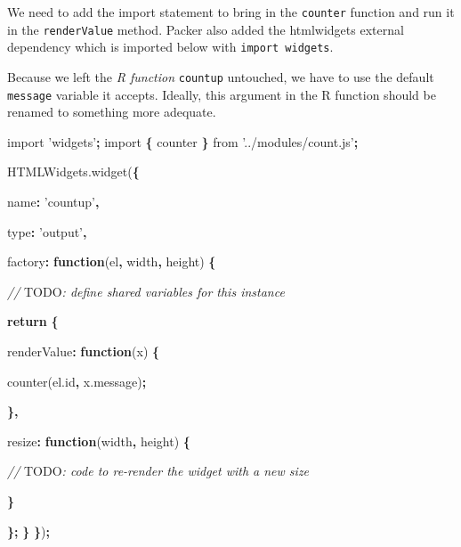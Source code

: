 \documentclass[10pt,]{krantz}
\makeatletter
\newenvironment{Shaded}{\begin{snugshade}}{\end{snugshade}}
\newcommand{\AlertTok}[1]{\textcolor[rgb]{0.33,0.33,0.33}{#1}}
\newcommand{\AttributeTok}[1]{\textcolor[rgb]{0.61,0.61,0.61}{#1}}
\newcommand{\CommentTok}[1]{\textcolor[rgb]{0.37,0.37,0.37}{\textit{#1}}}
\newcommand{\ControlFlowTok}[1]{\textcolor[rgb]{0.27,0.27,0.27}{\textbf{#1}}}
\newcommand{\DataTypeTok}[1]{\textcolor[rgb]{0.27,0.27,0.27}{#1}}
\newcommand{\ImportTok}[1]{#1}
\newcommand{\KeywordTok}[1]{\textcolor[rgb]{0.27,0.27,0.27}{\textbf{#1}}}
\newcommand{\NormalTok}[1]{#1}
\newcommand{\OperatorTok}[1]{\textcolor[rgb]{0.43,0.43,0.43}{\textbf{#1}}}
\newcommand{\StringTok}[1]{\textcolor[rgb]{0.5,0.5,0.5}{#1}}
\newcommand{\VariableTok}[1]{\textcolor[rgb]{0,0,0}{#1}}
\newenvironment{kframe}{%
\medskip{}
\setlength{\fboxsep}{.8em}
 \def\at@end@of@kframe{}%
 \ifinner\ifhmode%
  \def\at@end@of@kframe{\end{minipage}}%
  \begin{minipage}{\columnwidth}%
 \fi\fi%
 \def\FrameCommand##1{\hskip\@totalleftmargin \hskip-\fboxsep
 \colorbox{shadecolor}{##1}\hskip-\fboxsep
     \hskip-\linewidth \hskip-\@totalleftmargin \hskip\columnwidth}%
 \MakeFramed {\advance\hsize-\width
   \@totalleftmargin\z@ \linewidth\hsize
   \@setminipage}}%
 {\par\unskip\endMakeFramed%
 \at@end@of@kframe}
\renewenvironment{Shaded}{\begin{kframe}}{\end{kframe}}
\makeatother
\begin{document}
We need to add the import statement to bring in the \texttt{counter} function and run it in the \texttt{renderValue} method. Packer also added the htmlwidgets external dependency which is imported below with \texttt{import\ \textquotesingle{}widgets\textquotesingle{}}.

Because we left the \emph{R function} \texttt{countup} untouched, we have to use the default \texttt{message} variable it accepts. Ideally, this argument in the R function should be renamed to something more adequate.

\begin{Shaded}
\begin{Highlighting}[]
\ImportTok{import} \StringTok{'widgets'}\OperatorTok{;}
\ImportTok{import} \OperatorTok{\{}\NormalTok{ counter }\OperatorTok{\}} \ImportTok{from} \StringTok{'../modules/count.js'}\OperatorTok{;} 

\VariableTok{HTMLWidgets}\NormalTok{.}\AttributeTok{widget}\NormalTok{(}\OperatorTok{\{}

  \DataTypeTok{name}\OperatorTok{:} \StringTok{'countup'}\OperatorTok{,}

  \DataTypeTok{type}\OperatorTok{:} \StringTok{'output'}\OperatorTok{,}

  \DataTypeTok{factory}\OperatorTok{:} \KeywordTok{function}\NormalTok{(el}\OperatorTok{,}\NormalTok{ width}\OperatorTok{,}\NormalTok{ height) }\OperatorTok{\{}

    \CommentTok{// }\AlertTok{TODO}\CommentTok{: define shared variables for this instance}

    \ControlFlowTok{return} \OperatorTok{\{}

      \DataTypeTok{renderValue}\OperatorTok{:} \KeywordTok{function}\NormalTok{(x) }\OperatorTok{\{}

        \AttributeTok{counter}\NormalTok{(}\VariableTok{el}\NormalTok{.}\AttributeTok{id}\OperatorTok{,} \VariableTok{x}\NormalTok{.}\AttributeTok{message}\NormalTok{)}\OperatorTok{;}

      \OperatorTok{\},}

      \DataTypeTok{resize}\OperatorTok{:} \KeywordTok{function}\NormalTok{(width}\OperatorTok{,}\NormalTok{ height) }\OperatorTok{\{}

        \CommentTok{// }\AlertTok{TODO}\CommentTok{: code to re-render the widget with a new size}

      \OperatorTok{\}}

    \OperatorTok{\};}
  \OperatorTok{\}}
\OperatorTok{\}}\NormalTok{)}\OperatorTok{;}
\end{Highlighting}
\end{Shaded}
\end{document}
